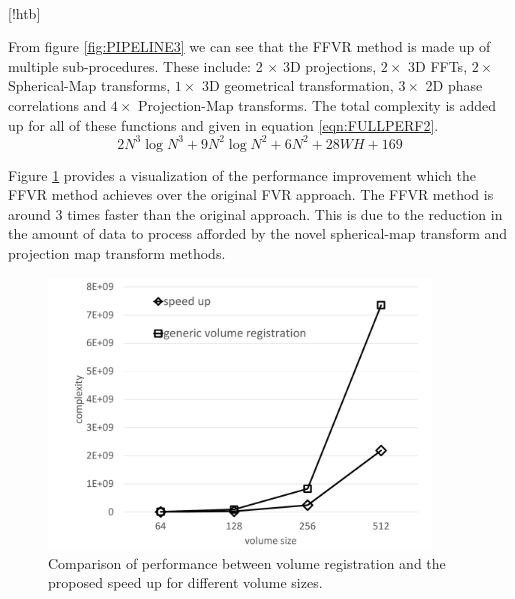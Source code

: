 \begin{table}[!htb]
\centering
{}
\\
\caption{Complexities for given Procedures}
\label{table:complexities2}
\end{table}[!htb]

From figure \ref{fig:PIPELINE3} we can see that the FFVR method is made up of multiple sub-procedures. These include: 2 $\times$ 3D projections, $2 \times$ 3D FFTs, $2 \times$ Spherical-Map transforms, $1 \times$ 3D geometrical transformation, $3 \times$ 2D phase correlations and $4 \times$ Projection-Map transforms. The total complexity is added up for all of these functions and given in equation \ref{eqn:FULLPERF2}. \\

\begin{equation} \label{eqn:FULLPERF2}
2N^3\log{N^3} + 9N^2\log{N^2} + 6N^2 + 28WH + 169
\end{equation}

Figure \ref{fig:perfComp} provides a visualization of the performance improvement which the FFVR method achieves over the original FVR approach. The FFVR method is around 3 times faster than the original approach. This is due to the reduction in the amount of data to process afforded by the novel spherical-map transform and projection map transform methods.

\begin{figure}[!htb]
\centering
\includegraphics[width=4.0in]{images/ch2/perfcomp}
\caption{Comparison of performance between volume registration and the proposed speed up for different volume sizes.}
\label{fig:perfComp}
\end{figure}
